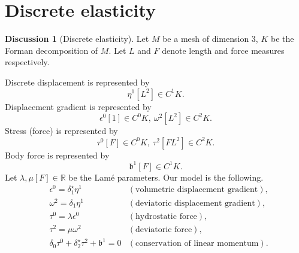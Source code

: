 \documentclass[fleqn]{article}
\theoremstyle{definition}
\newtheorem{discussion}[theorem]{Discussion}
\newcommand{\R}{\mathbb{R}}
\begin{document}
\section{Discrete elasticity}

\begin{discussion}[Discrete elasticity]
  Let $M$ be a mesh of dimension $3$, $K$ be the Forman decomposition of $M$.
  Let $L$ and $F$ denote length and force measures respectively.

  Discrete displacement is represented by
  \begin{equation}
    \eta^1 [L^2] \in C^1 K.
  \end{equation}
  Displacement gradient is represented by
  \begin{equation}
    \epsilon^0 [1] \in C^0 K,\ \omega^2 [L^2] \in C^2 K.
  \end{equation}
  Stress (force) is represented by
  \begin{equation}
    \tau^0 [F] \in C^0 K,\ \tau^2 [F L^2] \in C^2 K.
  \end{equation}
  Body force is represented by
  \begin{equation}
    \mathfrak{b}^1 [F] \in C^1 K.
  \end{equation}
  Let $\lambda, \mu [F] \in \R$ be the Lam{\'e} parameters.
  Our model is the following.
  \begin{subequations}
    \begin{align}
      & \epsilon^0 = \delta_1^\star \eta^1
      & (\text{volumetric displacement gradient}), \\
      & \omega^2 = \delta_1 \eta^1
      & (\text{deviatoric displacement gradient}), \\
      & \tau^0 = \lambda \epsilon^0
      & (\text{hydrostatic force}), \\
      & \tau^2 = \mu \omega^2
      & (\text{deviatoric force}), \\
      & \delta_0 \tau^0 + \delta_2^\star \tau^2 + \mathfrak{b}^1 = 0
      & (\text{conservation of linear momentum}).
    \end{align}
  \end{subequations}
\end{discussion}
\end{document}
